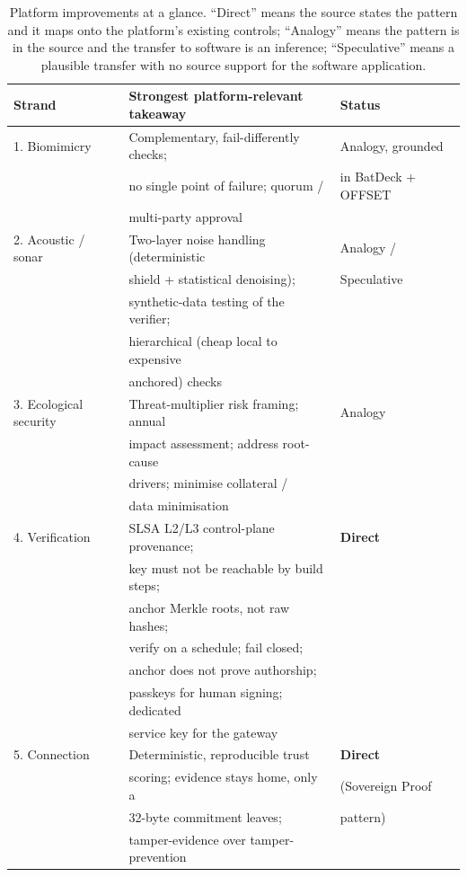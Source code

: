 \documentclass[11pt]{article}
\begin{document}
\begin{table}[h]
\centering
\begin{tabular}{lll}
\toprule
Strand & Strongest platform-relevant takeaway & Status \\
\midrule
1. Biomimicry & Complementary, fail-differently checks; & Analogy, grounded \\
& no single point of failure; quorum / & in BatDeck + OFFSET \\
& multi-party approval & \\
2. Acoustic / sonar & Two-layer noise handling (deterministic & Analogy / \\
& shield + statistical denoising); & Speculative \\
& synthetic-data testing of the verifier; & \\
& hierarchical (cheap local to expensive & \\
& anchored) checks & \\
3. Ecological security & Threat-multiplier risk framing; annual & Analogy \\
& impact assessment; address root-cause & \\
& drivers; minimise collateral / & \\
& data minimisation & \\
4. Verification & SLSA L2/L3 control-plane provenance; & \textbf{Direct} \\
& key must not be reachable by build steps; & \\
& anchor Merkle roots, not raw hashes; & \\
& verify on a schedule; fail closed; & \\
& anchor does not prove authorship; & \\
& passkeys for human signing; dedicated & \\
& service key for the gateway & \\
5. Connection & Deterministic, reproducible trust & \textbf{Direct} \\
& scoring; evidence stays home, only a & (Sovereign Proof \\
& 32-byte commitment leaves; & pattern) \\
& tamper-evidence over tamper-prevention & \\
\bottomrule
\end{tabular}
\caption{Platform improvements at a glance. ``Direct'' means the source
states the pattern and it maps onto the platform's existing controls;
``Analogy'' means the pattern is in the source and the transfer to
software is an inference; ``Speculative'' means a plausible transfer
with no source support for the software application.}
\label{tab:glance}
\end{table}
\end{document}
